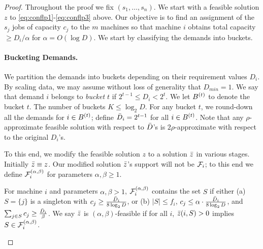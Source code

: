 \begin{proof}
	    Throughout the proof we fix $(s_1,\ldots,s_n)$. 
	    We start with a feasible solution $z$ to \eqref{eq:conflp1}-\eqref{eq:conflp3} above. 
	    Our objective is to find an assignment of the $s_j$ jobs of capacity $c_j$ to the $m$ machines so that machine $i$ obtains total capacity $\geq D_i/\alpha$ for $\alpha = O(\log D)$. 	  
	    We start by classifying the demands into buckets.
	    
	    	\paragraph{Bucketing Demands.} We partition the demands into buckets depending on their requirement values $D_i$. By scaling data, we may assume without loss of generality that $D_{min} = 1$. 
	    	We say that demand $i$ belongs to \emph{bucket $t$} if $2^{t-1} \leq D_i < 2^t$. We let $B^{(t)}$ to denote the bucket $t$. The number of buckets $K \leq \log_2 D$. 
	    	For any bucket $t$, we round-down all the demands for $i\in B^{(t)}$; define $\bar{D}_i = 2^{t-1}$ for all $i\in B^{(t)}$. Note that any $\rho$-approximate feasible solution with respect to $\bar{D}$'s is $2\rho$-approximate with respect to the original $D_i$'s. \smallskip
	    
	    
	    
	    
\noindent
  To this end, we modify the feasible solution $z$ to a solution $\bar z$  in various stages. Initially $\bar z \equiv z$. 
	    Our modified solution $\bar z$'s support will not be ${\cal F}_i$; to this end we define ${\cal F}^{(\alpha,\beta)}_i$ for parameters $\alpha,\beta \geq 1$.
	    \begin{definition}
For machine $i$ and parameters $\alpha,\beta > 1$, ${\cal F}^{(\alpha,\beta)}_i$ contains the set $S$ if either (a) $S = \{j\}$ is a singleton with $c_j \geq \frac{\bar{D}_i}{8\log_2 D}$, 
or (b) $|S|\leq f_i$, $c_j \leq \alpha \cdot \frac{\bar{D}_i}{8\log_2 D}$, and $\sum_{j\in S} c_j \geq \frac{\bar{D}_i}{\beta}$. 	    We say $\bar z$ is $(\alpha,\beta)$-feasible if for all $i$, $\bar z(i,S) > 0$ implies $S\in {\cal F}^{(\alpha,\beta)}_i$.
	    \end{definition}
	    \noindent

	    \medskip
	
		

\end{proof}
